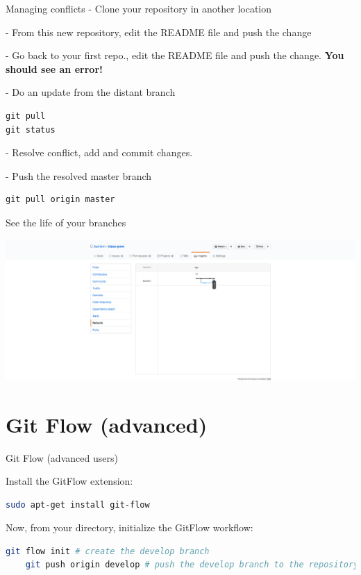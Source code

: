 \documentclass[svgnames]{beamer}
\begin{document}
\begin{frame}[fragile]{Managing conflicts}
    - Clone your repository in another location

    - From this new repository, edit the README file and push the change
    
    - Go back to your first repo., edit the README file and push the change. \textbf{You should see an error!}
    
    - Do an update from the distant branch
\begin{lstlisting}
git pull
git status
\end{lstlisting}
    - Resolve conflict, add and commit changes.
    
    - Push the resolved master branch
\begin{lstlisting}
git pull origin master
\end{lstlisting}
\end{frame}

\begin{frame}{See the life of your branches}
    \begin{center}
    \includegraphics[scale=0.2]{img/network.png}
    \end{center}
\end{frame}

\section{Git Flow (advanced)}

\begin{frame}[fragile]{Git Flow (advanced users)}

    Install the GitFlow extension:

    \begin{lstlisting}[language=bash]
    sudo apt-get install git-flow
    \end{lstlisting}

    \vspace{1em}
    Now, from your directory, initialize the GitFlow workflow:

    \begin{lstlisting}[language=bash]
    git flow init # create the develop branch
    git push origin develop # push the develop branch to the repository
    \end{lstlisting}

\end{frame}
\end{document}

